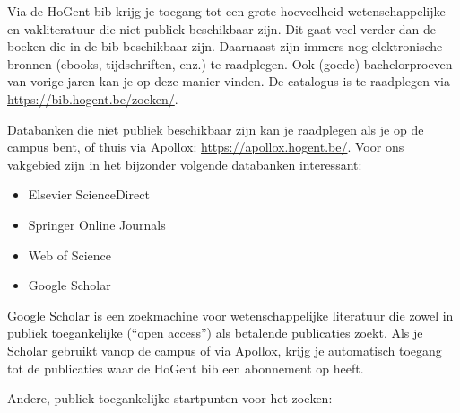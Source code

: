 Via de HoGent bib krijg je toegang tot een grote hoeveelheid wetenschappelijke en vakliteratuur die niet publiek beschikbaar zijn. Dit gaat veel verder dan de boeken die in de bib beschikbaar zijn. Daarnaast zijn immers nog elektronische bronnen (ebooks, tijdschriften, enz.) te raadplegen. Ook (goede) bachelorproeven van vorige jaren kan je op deze manier vinden. De catalogus is te raadplegen via \url{https://bib.hogent.be/zoeken/}.

Databanken die niet publiek beschikbaar zijn kan je raadplegen als je op de campus bent, of thuis via Apollox: \url{https://apollox.hogent.be/}. Voor ons vakgebied zijn in het bijzonder volgende databanken interessant:

\begin{itemize}
  \item Elsevier ScienceDirect
  \item Springer Online Journals
  \item Web of Science
  \item Google Scholar
\end{itemize}

Google Scholar is een zoekmachine voor wetenschappelijke literatuur die zowel in publiek toegankelijke (``open access'') als betalende publicaties zoekt. Als je Scholar gebruikt vanop de campus of via Apollox, krijg je automatisch toegang tot de publicaties waar de HoGent bib een abonnement op heeft.

Andere, publiek toegankelijke startpunten voor het zoeken:

